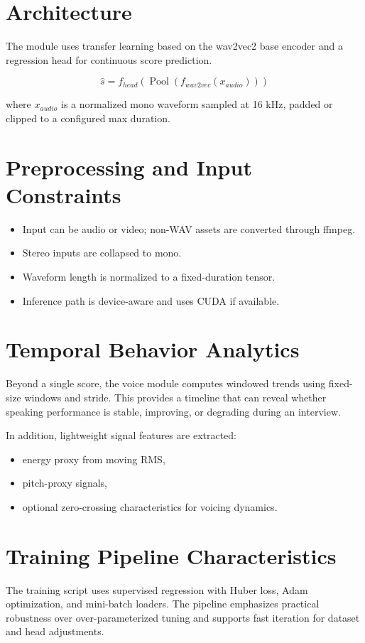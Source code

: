 \documentclass[12pt,a4paper]{report}
\begin{document}
\section{Architecture}
The module uses transfer learning based on the wav2vec2 base encoder and a regression head for continuous score prediction.

\begin{equation}
\hat{s} = f_{head}(\operatorname{Pool}(f_{wav2vec}(x_{audio})))
\end{equation}

where $x_{audio}$ is a normalized mono waveform sampled at 16 kHz, padded or clipped to a configured max duration.

\section{Preprocessing and Input Constraints}
\begin{itemize}[leftmargin=1.5em]
\item Input can be audio or video; non-WAV assets are converted through ffmpeg.
\item Stereo inputs are collapsed to mono.
\item Waveform length is normalized to a fixed-duration tensor.
\item Inference path is device-aware and uses CUDA if available.
\end{itemize}

\section{Temporal Behavior Analytics}
Beyond a single score, the voice module computes windowed trends using fixed-size windows and stride. This provides a timeline that can reveal whether speaking performance is stable, improving, or degrading during an interview.

In addition, lightweight signal features are extracted:
\begin{itemize}[leftmargin=1.5em]
\item energy proxy from moving RMS,
\item pitch-proxy signals,
\item optional zero-crossing characteristics for voicing dynamics.
\end{itemize}

\section{Training Pipeline Characteristics}
The training script uses supervised regression with Huber loss, Adam optimization, and mini-batch loaders. The pipeline emphasizes practical robustness over over-parameterized tuning and supports fast iteration for dataset and head adjustments.
\end{document}
